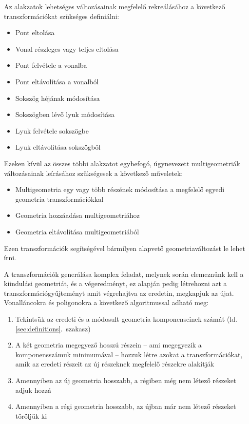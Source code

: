  Az alakzatok lehetséges változásainak megfelelő rekreálásához a következő transzformációkat szükséges definiálni:
\begin{itemize}
	\item Pont eltolása
	\item Vonal részleges vagy teljes eltolása
	\item Pont felvétele a vonalba
	\item Pont eltávolítása a vonalból
	\item Sokszög héjának módosítása
	\item Sokszögben lévő lyuk módosítása
	\item Lyuk felvétele sokszögbe
	\item Lyuk eltávolítása sokszögből
\end{itemize}
Ezeken kívül az összes többi alakzatot egybefogó, úgynevezett multigeometriák változásainak leírásához szükségesek a következő műveletek:
\begin{itemize}
	\item Multigeometria egy vagy több részének módosítása a megfelelő egyedi geometria transzformációkkal
	\item Geometria hozzáadása multigeometriához
	\item Geometria eltávolítása multigeometriából
\end{itemize}
Ezen transzformációk segítségével bármilyen alapvető geometriaváltozást le lehet írni.

A transzformációk generálása komplex feladat, melynek során elemeznünk kell a kiindulási geometriát, és a végeredményt, ez alapján pedig létrehozni azt a transzformációgyűjteményt amit végrehajtva az eredetin, megkapjuk az újat. Vonalláncokra és poligonokra a következő algoritmussal adható meg:
\begin{enumerate}
	\item Tekintsük az eredeti és a módosult geometria komponenseinek számát (ld. \ref{sec:definitions}.~szakasz)
	\item A két geometria megegyező hosszú részein -- ami megegyezik a komponensszámuk minimumával -- hozzuk létre azokat a transzformációkat, amik az eredeti részeit az új részeknek megfelelő részekre alakítják
	\item Amennyiben az új geometria hosszabb, a régiben még nem létező részeket adjuk hozzá
	\item Amennyiben a régi geometria hosszabb, az újban már nem létező részeket töröljük ki
\end{enumerate}

